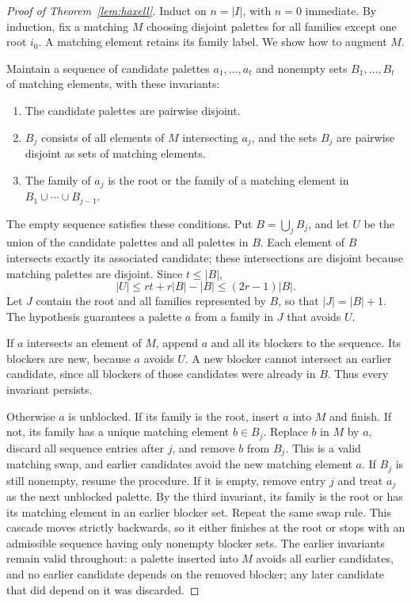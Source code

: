 \documentclass[11pt]{article}
\theoremstyle{definition}
\theoremstyle{remark}
\begin{document}
\begin{proof}[Proof of Theorem~\ref{lem:haxell}]
Induct on $n=|I|$, with $n=0$ immediate.  By induction, fix a matching $M$ choosing disjoint
palettes for all families except one root $i_0$.  A matching element
retains its family label.  We show how to augment $M$.

Maintain a sequence of candidate palettes $a_1,\ldots,a_t$ and nonempty
sets $B_1,\ldots,B_t$ of matching elements, with these invariants:
\begin{enumerate}
\item The candidate palettes are pairwise disjoint.
\item $B_j$ consists of all elements of $M$ intersecting $a_j$, and
      the sets $B_j$ are pairwise disjoint as sets of matching elements.
\item The family of $a_j$ is the root or the family of a matching
      element in $B_1\cup\cdots\cup B_{j-1}$.
\end{enumerate}
The empty sequence satisfies these conditions.  Put
$B=\bigcup_j B_j$, and let $U$ be the union of the candidate palettes
and all palettes in $B$.  Each element of $B$ intersects exactly its
associated candidate; these intersections are disjoint because matching
palettes are disjoint.  Since $t\le|B|$,
\[
 |U|\le rt+r|B|-|B|\le(2r-1)|B|.
\]
Let $J$ contain the root and all families represented by $B$, so that
$|J|=|B|+1$.  The hypothesis guarantees a palette $a$ from a family in
$J$ that avoids $U$.

If $a$ intersects an element of $M$, append $a$ and all its blockers
to the sequence.  Its blockers are new, because $a$ avoids $U$.
A new blocker cannot intersect an earlier candidate, since all blockers
of those candidates were already in $B$.  Thus every invariant persists.

Otherwise $a$ is unblocked.  If its family is the root, insert $a$ into
$M$ and finish.  If not, its family has a unique matching element
$b\in B_j$.  Replace $b$ in $M$ by $a$, discard all sequence entries
after $j$, and remove $b$ from $B_j$.  This is a valid matching swap,
and earlier candidates avoid the new matching element $a$.
If $B_j$ is still nonempty, resume the procedure.  If it is empty,
remove entry $j$ and treat $a_j$ as the next unblocked palette.
By the third invariant, its family is the root or has its matching
element in an earlier blocker set.  Repeat the same swap rule.
This cascade moves strictly backwards, so it either finishes at the
root or stops with an admissible sequence having only nonempty blocker
sets.  The earlier invariants remain valid throughout: a palette
inserted into $M$ avoids all earlier candidates, and no earlier candidate
depends on the removed blocker; any later candidate that did depend
on it was discarded.


\end{proof}
\end{document}
